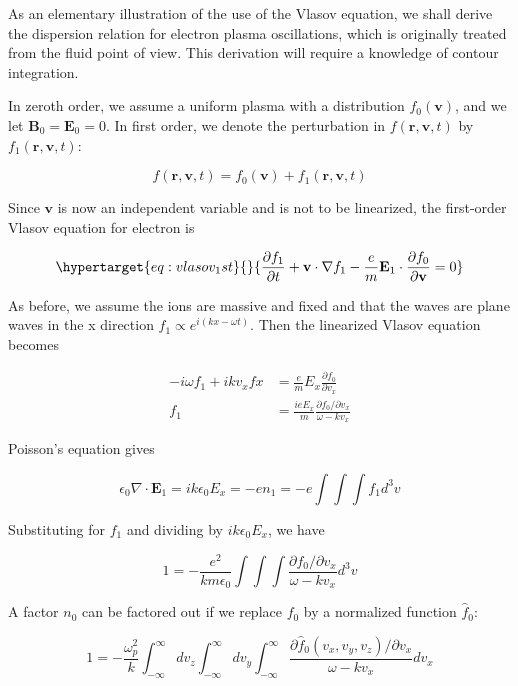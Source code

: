 \documentclass[
  notoc %
]{tufte-book}
\begin{document}
As an elementary illustration of the use of the Vlasov equation, we
shall derive the dispersion relation for electron plasma oscillations,
which is originally treated from the fluid point of view. This
derivation will require a knowledge of contour integration.

In zeroth order, we assume a uniform plasma with a distribution
\(f_0(\mathbf{v})\), and we let \(\mathbf{B}_0 = \mathbf{E}_0 = 0\). In
first order, we denote the perturbation in
\(f(\mathbf{r},\mathbf{v},t)\) by \(f_1(\mathbf{r},\mathbf{v},t)\):

\[
f(\mathbf{r},\mathbf{v},t) = f_0(\mathbf{v}) + f_1(\mathbf{r},\mathbf{v},t)
\]

Since \(\mathbf{v}\) is now an independent variable and is not to be
linearized, the first-order Vlasov equation for electron is

\begin{equation}\protect\hypertarget{eq:vlasov_1st}{}{
\frac{\partial f_1}{\partial t} + \mathbf{v}\cdot\nabla f_1 - \frac{e}{m}\mathbf{E}_1\cdot\frac{\partial f_0}{\partial \mathbf{v}} = 0
}\label{eq:vlasov_1st}\end{equation}

As before, we assume the ions are massive and fixed and that the waves
are plane waves in the x direction \(f_1 \propto e^{i(kx - \omega t)}\).
Then the linearized Vlasov equation becomes

\[
\begin{aligned}
-i\omega f_1 + ikv_x fx &= \frac{e}{m}E_x\frac{\partial f_0}{\partial v_x} \\
f_1 &= \frac{ieE_x}{m}\frac{\partial f_0/\partial v_x}{\omega - kv_x}
\end{aligned}
\]

Poisson's equation gives

\[
\epsilon_0\nabla\cdot\mathbf{E}_1 = ik\epsilon_0 E_x = -en_1 = -e\int\int\int f_1 d^3v
\]

Substituting for \(f_1\) and dividing by \(ik\epsilon_0 E_x\), we have

\[
1 = -\frac{e^2}{km\epsilon_0}\int\int\int \frac{\partial f_0/\partial v_x}{\omega - k v_x}d^3v
\]

A factor \(n_0\) can be factored out if we replace \(f_0\) by a
normalized function \(\hat{f}_0\):

\[
1 = -\frac{\omega_p^2}{k}\int_{-\infty}^{\infty}dv_z\int_{-\infty}^{\infty}dv_y\int_{-\infty}^{\infty}\frac{\partial \hat{f}_0(v_x, v_y, v_z)/\partial v_x}{\omega- k v_x}dv_x
\]
\end{document}
